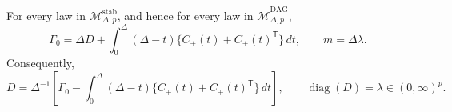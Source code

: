 For every law in \(\mathcal M_{\Delta,p}^{\mathrm{stab}}\), and hence for every law in \(\overline{\mathcal M}_{\Delta,p}^{\mathrm{DAG}}\),
\[
 \Gamma_0=\Delta D+\int_0^\Delta(\Delta-t)
 \{C_{+}(t)+C_{+}(t)^{\mathsf T}\}\,dt,
 \qquad m=\Delta\lambda.
\]
Consequently,
\[
 D=\Delta^{-1}\!\left[\Gamma_0-
 \int_0^\Delta(\Delta-t)
 \{C_{+}(t)+C_{+}(t)^{\mathsf T}\}\,dt\right],
 \qquad \operatorname{diag}(D)=\lambda\in(0,\infty)^p.
\]